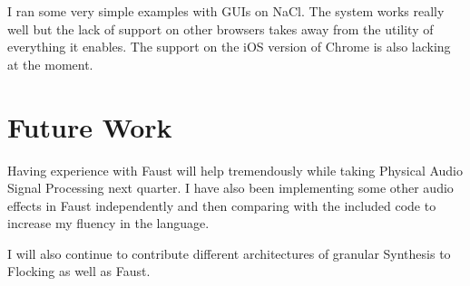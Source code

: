\documentclass[12pt]{article}
\begin{document}
I ran some very simple examples with GUIs on NaCl. The system works really well but the lack of support on other browsers takes away from the utility of everything it enables. The support on the iOS version of Chrome is also lacking at the moment.

\section{Future Work}\label{future}
Having experience with Faust will help tremendously while taking Physical Audio Signal Processing next quarter. I have also been implementing some other audio effects in Faust independently and then comparing with the included code to increase my fluency in the language.

I will also continue to contribute different architectures of granular Synthesis to Flocking as well as Faust.



\end{document}
